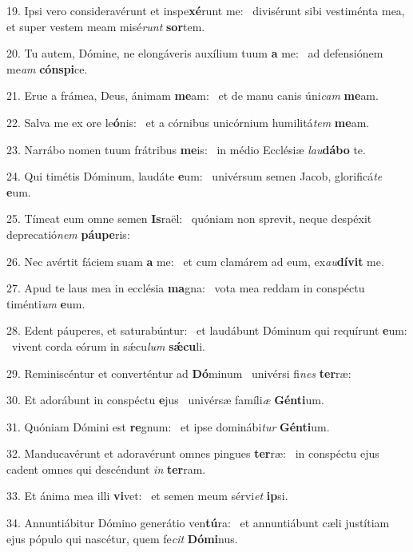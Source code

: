 19. Ipsi vero consideravérunt et inspe\textbf{xé}runt me: \ast\  divisérunt sibi vestiménta mea, et super vestem meam misé\textit{runt} \textbf{sor}tem.\

20. Tu autem, Dómine, ne elongáveris auxílium tuum \textbf{a} me: \ast\  ad defensiónem me\textit{am} \textbf{cón}\textbf{spi}ce.\

21. Erue a frámea, Deus, ánimam \textbf{me}am: \ast\  et de manu canis úni\textit{cam} \textbf{me}am.\

22. Salva me ex ore le\textbf{ó}nis: \ast\  et a córnibus unicórnium humilitá\textit{tem} \textbf{me}am.\

23. Narrábo nomen tuum frátribus \textbf{me}is: \ast\  in médio Ecclésiæ \textit{lau}\textbf{dá}\textbf{bo} te.\

24. Qui timétis Dóminum, laudáte \textbf{e}um: \ast\  univérsum semen Jacob, glorificá\textit{te} \textbf{e}um.\

25. Tímeat eum omne semen \textbf{Is}raël: \ast\  quóniam non sprevit, neque despéxit deprecatió\textit{nem} \textbf{páu}\textbf{pe}ris:\

26. Nec avértit fáciem suam \textbf{a} me: \ast\  et cum clamárem ad eum, ex\textit{au}\textbf{dí}\textbf{vit} me.\

27. Apud te laus mea in ecclésia \textbf{ma}gna: \ast\  vota mea reddam in conspéctu timénti\textit{um} \textbf{e}um.\

28. Edent páuperes, et saturabúntur: \dag\  et laudábunt Dóminum qui requírunt \textbf{e}um: \ast\  vivent corda eórum in sǽcu\textit{lum} \textbf{sǽ}\textbf{cu}li.\

29. Reminiscéntur et converténtur ad \textbf{Dó}minum \ast\  univérsi fi\textit{nes} \textbf{ter}ræ:\

30. Et adorábunt in conspéctu \textbf{e}jus \ast\  univérsæ famíli\textit{æ} \textbf{Gén}\textbf{ti}um.\

31. Quóniam Dómini est \textbf{re}gnum: \ast\  et ipse dominábi\textit{tur} \textbf{Gén}\textbf{ti}um.\

32. Manducavérunt et adoravérunt omnes pingues \textbf{ter}ræ: \ast\  in conspéctu ejus cadent omnes qui descéndunt \textit{in} \textbf{ter}ram.\

33. Et ánima mea illi \textbf{vi}vet: \ast\  et semen meum sérvi\textit{et} \textbf{ip}si.\

34. Annuntiábitur Dómino generátio ven\textbf{tú}ra: \ast\  et annuntiábunt cæli justítiam ejus pópulo qui nascétur, quem fe\textit{cit} \textbf{Dó}\textbf{mi}nus.\


